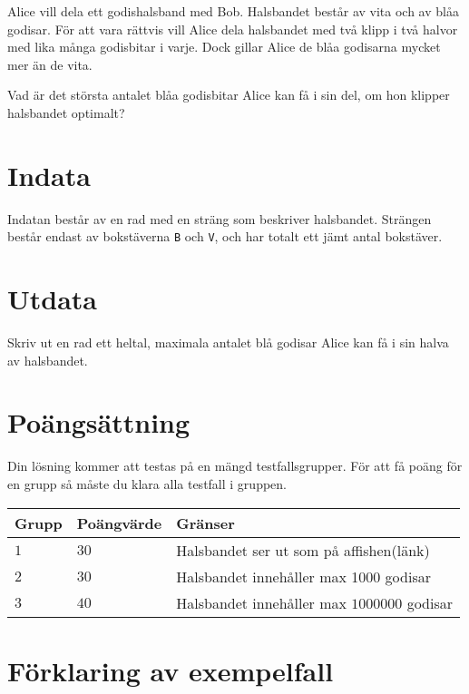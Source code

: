 Alice vill dela ett godishalsband med Bob. 
Halsbandet består av vita och av blåa godisar. 
För att vara rättvis vill Alice dela halsbandet med
två klipp i två halvor med lika många godisbitar i varje.
Dock gillar Alice de blåa godisarna mycket mer än de vita.

Vad är det största antalet blåa godisbitar Alice kan få i sin del,
om hon klipper halsbandet optimalt?

\section*{Indata}
Indatan består av en rad med en sträng som beskriver halsbandet.
Strängen består endast av bokstäverna \texttt{B} och \texttt{V},
och har totalt ett jämt antal bokstäver. 


\section*{Utdata}
Skriv ut en rad ett heltal, maximala antalet blå godisar Alice
kan få i sin halva av halsbandet.

\section*{Poängsättning}
Din lösning kommer att testas på en mängd testfallsgrupper.
För att få poäng för en grupp så måste du klara alla testfall i gruppen.

\noindent
\begin{tabular}{| l | l | l |}
\hline
Grupp & Poängvärde & Gränser \\ \hline
$1$    & $30$       &  Halsbandet ser ut som på affishen(länk) \\ \hline 
$2$    & $30$       &  Halsbandet innehåller max 1000 godisar\\ \hline 
$3$    & $40$       &  Halsbandet innehåller max $1000000$ godisar \\ \hline
\end{tabular}

\section*{Förklaring av exempelfall}
